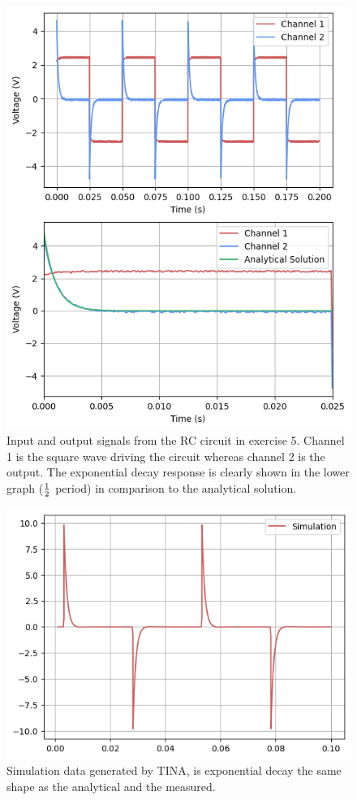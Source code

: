 \documentclass[%
reprint,
amsmath,amssymb,
aps,
floatfix
]{revtex4-2}
\begin{document}
	
		\begin{figure}
			\includegraphics[width=0.85\columnwidth]{ex5_dualPlot.png}
			\caption{\label{fig:ex5Results}Input and output signals from the RC circuit in exercise 5. Channel 1 is the square wave driving the circuit whereas channel 2 is the output. The exponential decay response is clearly shown in the lower graph ($1\over2$ period) in comparison to the analytical solution.}
		\end{figure}
		\begin{figure}
			\includegraphics[width=0.85\columnwidth]{ex5_simPlot.png}
			\caption{\label{fig:ex5Sim}Simulation data generated by TINA, is exponential decay the same shape as the analytical and the measured.}
		\end{figure}
\end{document}
